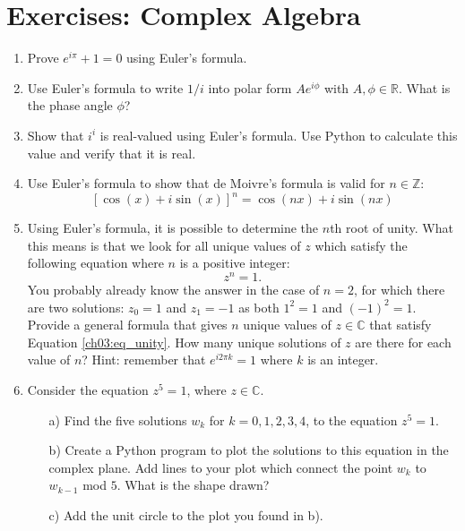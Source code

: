 \newpage
\section{Exercises: Complex Algebra}

\begin{enumerate}
  \item Prove $e^{i\pi}+1=0$ using Euler's formula.

  \item Use Euler's formula to write $1/i$ into polar form $Ae^{i\phi}$ with $A,\phi\in\mathbb{R}$.
        What is the phase angle $\phi$?

  \item Show that $i^{i}$ is real-valued using Euler's formula.
        Use Python to calculate this value and verify that it is real.

  \item Use Euler's formula to show that de Moivre's formula is valid for $n\in\mathbb{Z}$:
        \[[\cos(x)+i\sin(x)]^{n}=\cos(nx)+i\sin(nx)\]

  \item Using Euler's formula, it is possible to determine the $n$th root of unity.
        What this means is that we look for all unique values of $z$ which
        satisfy the following equation where $n$ is a positive integer:
        \begin{equation}
          z^{n} = 1.
          \label{ch03:eq_unity}
        \end{equation}
        You probably already know the answer in the case of $n=2$, for which there are two solutions:
        $z_{0}=1$ and $z_{1}=-1$ as both $1^{2}=1$ and $(-1)^{2}=1$. \\
        Provide a general formula that gives $n$ unique values of $z\in\mathbb{C}$ that
        satisfy Equation \ref{ch03:eq_unity}. How many unique solutions of $z$ are there
        for each value of $n$? Hint: remember that $e^{i 2\pi k} = 1$ where
        $k$ is an integer.

  \item Consider the equation $z^{5}=1$, where $z\in\mathbb{C}$.
        \begin{itemize}
          \item[a)] Find the five solutions $w_{k}$ for $k=0,1,2,3,4$, to the equation $z^{5}=1$.
          \item[b)] Create a Python program to plot the solutions to this equation in the complex plane. Add lines to your plot which connect the point $w_{k}$ to $w_{k-1}$ mod $5$. What is the shape drawn?
          \item[c)] Add the unit circle to the plot you found in b).
        \end{itemize}


\end{enumerate}

